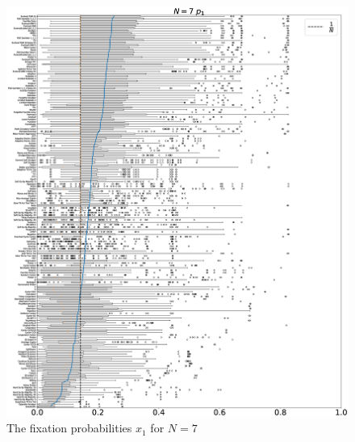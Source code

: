 \documentclass[10pt,letterpaper]{article}
\begin{document}
\begin{figure}[!hbtp]
    \centering
    \includegraphics[draft, width=\textwidth]{./Fig17.eps}
    \caption{The fixation probabilities \(x_1\) for \(N=7\)}
\end{figure}
\end{document}
